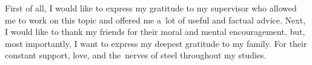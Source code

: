 \documentclass[english,bachelor,unicode]{ctufit-thesis}
\theoremstyle{plain}
\theoremstyle{definition}
\theoremstyle{remark}
\numberwithin{theorem}{chapter}
\begin{document}
 
\frontmatter\frontmatterinit %


\thispagestyle{empty}\cleardoublepage\maketitle %

\imprintpage %

\tableofcontents %
\listoffigures %
\begingroup
\let\clearpage\relax
\listoftables %
\endgroup

\begin{acknowledgmentpage}
	First of all, I would like to express my gratitude to my supervisor who allowed me to work on this topic and offered me a~lot of useful and factual advice. Next, I would like to thank my friends for their moral and mental encouragement, but, most importantly, I want to express my deepest gratitude to my family. For their constant support, love, and the~nerves of steel throughout my studies.
\end{acknowledgmentpage} 
\end{document}
